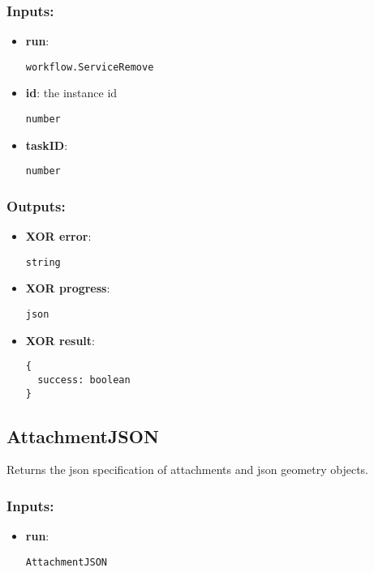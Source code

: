 \subsubsection*{Inputs:}
\begin{itemize}
    \item \textbf{run}: 
\begin{lstlisting}
workflow.ServiceRemove
\end{lstlisting}
    \item \textbf{id}: the instance id
\begin{lstlisting}
number
\end{lstlisting}
    \item \textbf{taskID}: 
\begin{lstlisting}
number
\end{lstlisting}
  \end{itemize}

\subsubsection*{Outputs:}
\begin{itemize}
    \item \textbf{XOR error}: 
\begin{lstlisting}
string
\end{lstlisting}
    \item \textbf{XOR progress}: 
\begin{lstlisting}
json
\end{lstlisting}
    \item \textbf{XOR result}: 
\begin{lstlisting}
{
  success: boolean
}
\end{lstlisting}
  \end{itemize}

\subsection{AttachmentJSON}
\label{ch:builtinservices:AttachmentJSON}
Returns the json specification of attachments and json geometry objects.
\subsubsection*{Inputs:}
\begin{itemize}
    \item \textbf{run}: 
\begin{lstlisting}
AttachmentJSON
\end{lstlisting}
  \end{itemize}

